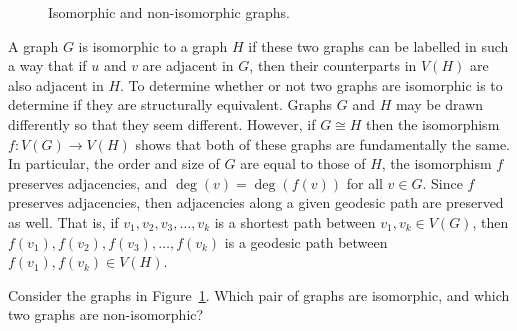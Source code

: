 \begin{figure}[!htbp]
\caption{Isomorphic and non-isomorphic graphs.}
\label{fig:introduction:isomorphic_graphs}
\end{figure}

A graph $G$ is isomorphic to a graph $H$ if these two graphs can be
labelled in such a way that if $u$ and $v$ are adjacent in $G$, then
their counterparts in $V(H)$ are also adjacent in $H$. To determine
whether or not two graphs are isomorphic is to determine if they are
structurally equivalent. Graphs $G$ and $H$ may be drawn differently
so that they seem different. However, if $G \cong H$ then the
isomorphism $f: V(G) \longrightarrow V(H)$ shows that both of these
graphs are fundamentally the same. In particular, the order and size
of $G$ are equal to those of $H$, the isomorphism $f$ preserves
adjacencies, and $\deg(v) = \deg(f(v))$ for all $v \in G$. Since $f$
preserves adjacencies, then adjacencies along a given geodesic path
are preserved as well. That is, if $v_1, v_2, v_3, \dots, v_k$ is a
shortest path between $v_1, v_k \in V(G)$, then
$f(v_1), f(v_2), f(v_3), \dots, f(v_k)$ is a geodesic path between
$f(v_1), f(v_k) \in V(H)$.


\begin{example}
Consider the graphs in
Figure~\ref{fig:introduction:isomorphic_graphs}. Which pair of graphs
are isomorphic, and which two graphs are non-isomorphic?
\end{example}

